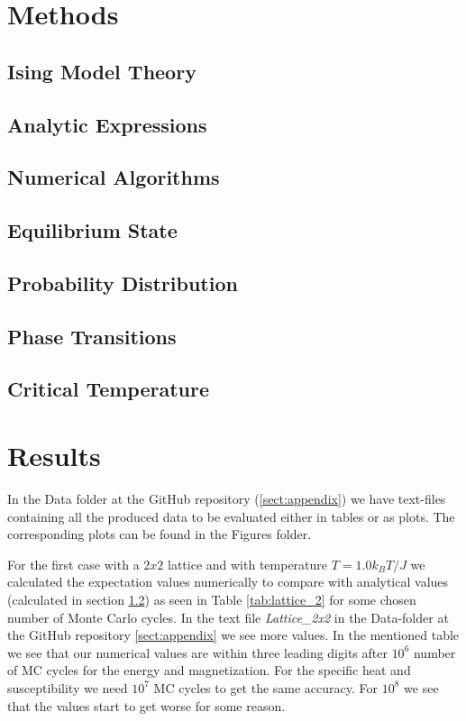 \documentclass[12pt,a4paper,english]{article}
\begin{document}
\section{Methods}
\label{sect:Methods}
\subsection{Ising Model Theory}
\label{subsect:Ising}
\subsection{Analytic Expressions}
\label{subsect:analytic}
\subsection{Numerical Algorithms}
\label{subsect:Algo}
\subsection{Equilibrium State}
\label{subsect:Equilibrium}
\subsection{Probability Distribution}
\label{subsect:Prob_dist}
\subsection{Phase Transitions}
\label{subsect:Phase_trans}
\subsection{Critical Temperature}
\label{subsect:TC}

\section{Results}
In the Data folder at the GitHub repository (\ref{sect:appendix}) we have text-files containing all the produced data to be evaluated either in tables or as plots. The corresponding plots can be found in the Figures folder.

For the first case with a $2x2$ lattice and with temperature $T=1.0 k_BT/J$ we calculated the expectation values numerically to compare with analytical values (calculated in section \ref{subsect:analytic}) as seen in Table \ref{tab:lattice_2} for some chosen number of Monte Carlo cycles. In the text file \textit{Lattice\_2x2} in the Data-folder at the GitHub repository \ref{sect:appendix} we see more values. In the mentioned table we see that our numerical values are within three leading digits after $10^6$ number of MC cycles for the energy and magnetization. For the specific heat and susceptibility we need $10^7$ MC cycles to get the same accuracy. For $10^8$ we see that the values start to get worse for some reason. 
\end{document}
